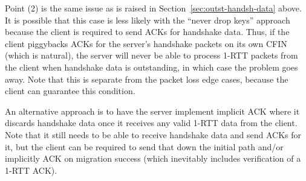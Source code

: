 \documentclass{article}
\begin{document}
Point (2) is the same issue as is raised in
Section~\ref{sec:outst-handsh-data} above. It is possible that this
case is less likely with the ``never drop keys'' approach because
the client is required to send ACKs for handshake data. Thus, if
the client piggybacks ACKs for the server's handshake packets
on its own CFIN (which is natural), the server will never be
able to process 1-RTT packets from the client when handshake
data is outstanding, in which case the problem goes away. Note
that this is separate from the packet loss edge cases, because
the client can guarantee this condition.

An alternative approach is to have the server implement
implicit ACK where it discards handshake data once it receives
any valid 1-RTT data from the client. Note that it still needs to
be able to receive handshake data and send ACKs for it, but
the client can be required to send that down the initial
path and/or implicitly ACK on migration success (which inevitably
includes verification of a 1-RTT ACK).
\end{document}
